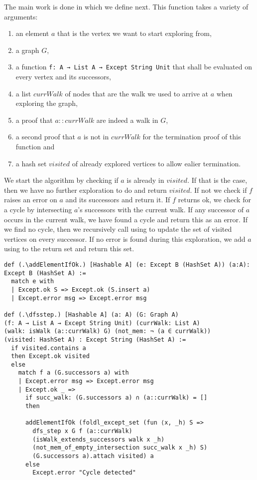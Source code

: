 The main work is done in \dfsstep which we define next. This function takes a variety of arguments:
\begin{enumerate}
    \item an element $a$ that is the vertex we want to start exploring from,
    \item a graph $G$,
    \item a function \lstinline|f: A → List A → Except String Unit| that shall be evaluated on every vertex and its successors,
    \item a list $currWalk$ of nodes that are the walk we used to arrive at $a$ when exploring the graph,
    \item a proof that $a::currWalk$ are indeed a walk in $G$,
    \item a second proof that $a$ is not in $currWalk$ for the termination proof of this function and
    \item a hash set $visited$ of already explored vertices to allow ealier termination.
\end{enumerate}

We start the algorithm by checking if $a$ is already in $visited$. If that is the case, then we have no further exploration to do and return $visited$. If not we check if $f$ raises an error on $a$ and its successors and return it. If $f$ returns ok, we check for a cycle by intersecting $a$'s successors with the current walk. If any successor of $a$ occurs in the current walk, we have found a cycle and return this as an error. If we find no cycle, then we recursively call \dfsstep using \foldlexceptset to update the set of visited vertices on every successor. If no error is found during this exploration, we add $a$ using \addElementIfOk to the return set and return this set.

\begin{lstlisting}
def (.\addElementIfOk.) [Hashable A] (e: Except B (HashSet A)) (a:A): Except B (HashSet A) :=
  match e with
  | Except.ok S => Except.ok (S.insert a)
  | Except.error msg => Except.error msg

def (.\dfsstep.) [Hashable A] (a: A) (G: Graph A) 
(f: A → List A → Except String Unit) (currWalk: List A) 
(walk: isWalk (a::currWalk) G) (not_mem: ¬ (a ∈ currWalk)) 
(visited: HashSet A) : Except String (HashSet A) :=
  if visited.contains a
  then Except.ok visited
  else
    match f a (G.successors a) with
    | Except.error msg => Except.error msg
    | Except.ok _ =>
      if succ_walk: (G.successors a) ∩ (a::currWalk) = []
      then

      addElementIfOk (foldl_except_set (fun ⟨x, _h⟩ S =>
        dfs_step x G f (a::currWalk) 
        (isWalk_extends_successors walk x _h) 
        (not_mem_of_empty_intersection succ_walk x _h) S) 
        (G.successors a).attach visited) a
      else
        Except.error "Cycle detected"
\end{lstlisting}


